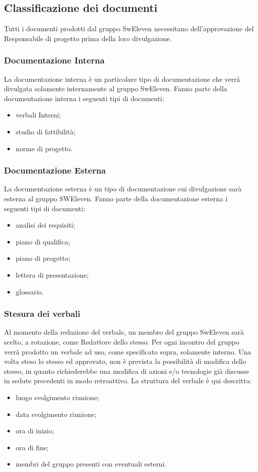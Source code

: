 \subsection{Classificazione dei documenti}
Tutti i documenti prodotti dal gruppo SwEleven necessitano dell’approvazione del Responsabile di progetto prima della loro divulgazione.

\subsubsection{Documentazione Interna}
La documentazione interna è un particolare tipo di documentazione che verrà divulgata solamente internamente al gruppo SwEleven. Fanno parte della documentazione interna i seguenti tipi di documenti:
\begin{itemize}
	\item verbali Interni;
	\item studio di fattibilità;
	\item norme di progetto.
\end{itemize}

\subsubsection{Documentazione Esterna}
La documentazione esterna è un tipo di documentazione cui divulgazione sarà esterna al gruppo SWEleven. Fanno parte della documentazione esterna i seguenti tipi di documenti:
\begin{itemize}
	\item analisi dei requisiti;
	\item piano di qualifica;
	\item piano di progetto;
	\item lettera di presentazione;
	\item glossario.
\end{itemize}

\subsubsection{Stesura dei verbali}
Al momento della redazione del verbale, un membro del gruppo SwEleven sarà scelto, a rotazione, come Redattore dello stesso. Per ogni incontro del gruppo verrà prodotto un verbale ad uso, come specificato sopra, solamente interno. Una volta steso lo stesso ed approvato, non è prevista la possibilità di modifica dello stesso, in quanto richiederebbe una modifica di azioni e/o tecnologie già discusse in sedute precedenti in modo retroattivo. La struttura del verbale è qui descritta:
\begin{itemize}
	\item luogo svolgimento riunione;
	\item data svolgimento riunione;
	\item ora di inizio;
	\item ora di fine;
	\item membri del gruppo presenti con eventuali esterni.
\end{itemize}

